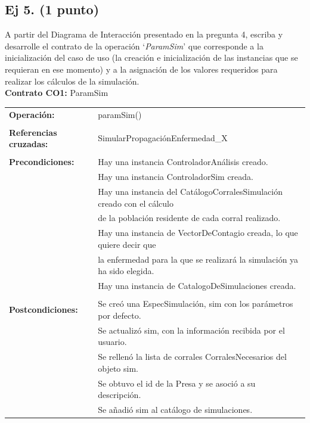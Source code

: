 \documentclass[a4paper]{article}
\begin{document}
\subsection{Ej 5. (1 punto)}
A partir del Diagrama de Interacción presentado en la pregunta 4, escriba y desarrolle el contrato de la operación ‘\textit{ParamSim}’ que corresponde a la inicialización del caso de uso (la creación e inicialización de las instancias que se requieran en ese momento) y a la asignación de los valores requeridos para realizar los cálculos de la simulación.\vspace{2em}
\\
\textbf{Contrato CO1:} ParamSim
\begin{table}[H]
	\begin{tabular}{ll}
		\textbf{Operación:}	& paramSim()\\		    
	    \\
		\textbf{Referencias cruzadas:} & SimularPropagaciónEnfermedad\_X\\
		\\
		\textbf{Precondiciones:} &Hay una instancia ControladorAnálisis creado.\\	 
		& Hay una instancia ControladorSim creada.\\
		& Hay una instancia del CatálogoCorralesSimulación creado con el cálculo\\ 
		& de la población residente de cada corral realizado.\\
		& Hay una instancia de VectorDeContagio creada, lo que quiere decir que\\ 
		& la enfermedad para la que se realizará la simulación ya ha sido elegida.\\
		& Hay una instancia de CatalogoDeSimulaciones creada.\\
		\\	
		\textbf{Postcondiciones:}
		& Se creó una EspecSimulación, sim con los parámetros por defecto.\\
		& Se actualizó sim, con la información recibida por el usuario.\\		
		& Se rellenó la lista de corrales CorralesNecesarios del objeto sim.\\
		& Se obtuvo el id de la Presa y se asoció a su descripción.\\
		& Se añadió sim  al catálogo de simulaciones.\\	

	\end{tabular}
\end{table}
\end{document}
